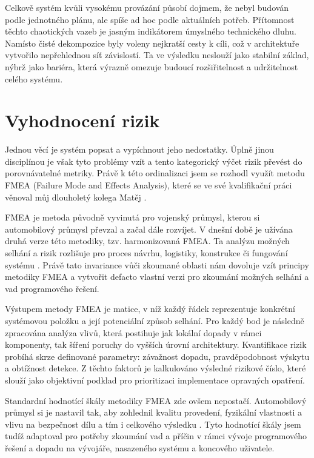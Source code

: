 \documentclass[FM,DP,fonts]{tulthesis}
\begin{document}
Celkově systém kvůli vysokému provázání působí dojmem, že nebyl budován podle jednotného plánu, ale spíše ad hoc podle aktuálních potřeb. Přítomnost těchto chaotických vazeb je jasným indikátorem úmyslného technického dluhu. Namísto čisté dekompozice byly voleny nejkratší cesty k cíli, což v architektuře vytvořilo nepřehlednou síť závislostí. Ta ve výsledku neslouží jako stabilní základ, nýbrž jako bariéra, která výrazně omezuje budoucí rozšiřitelnost a udržitelnost celého systému.

\section{Vyhodnocení rizik}
Jednou věcí je systém popsat a vypíchnout jeho nedostatky. Úplně jinou disciplínou je však tyto problémy vzít a tento kategorický výčet rizik převést do porovnávatelné metriky. Právě k této ordinalizaci jsem se rozhodl využít metodu FMEA (Failure Mode and Effects Analysis), které se ve své kvalifikační práci věnoval můj dlouholetý kolega Matěj \textcite{vokal-thesis}.

FMEA je metoda původně vyvinutá pro vojenský průmysl, kterou si automobilový průmysl převzal a začal dále rozvíjet. V dnešní době je užívána druhá verze této metodiky, tzv. harmonizovaná FMEA. Ta analýzu možných selhání a rizik rozlišuje pro proces návrhu, logistiky, konstrukce či fungování systému \parencite{vokal-thesis}. Právě tato invariance vůči zkoumané oblasti nám dovoluje vzít principy metodiky FMEA a vytvořit defacto vlastní verzi pro zkoumání možných selhání a vad programového řešení.

Výstupem metody FMEA je matice, v níž každý řádek reprezentuje konkrétní systémovou položku a její potenciální způsob selhání. Pro každý bod je následně zpracována analýza vlivů, která postihuje jak lokální dopady v rámci komponenty, tak šíření poruchy do vyšších úrovní architektury. Kvantifikace rizik probíhá skrze definované parametry: závažnost dopadu, pravděpodobnost výskytu a obtížnost detekce. Z těchto faktorů je kalkulováno výsledné rizikové číslo, které slouží jako objektivní podklad pro prioritizaci implementace opravných opatření.

Standardní hodnotící škály metodiky FMEA zde ovšem nepostačí. Automobilový průmysl si je nastavil tak, aby zohlednil kvalitu provedení, fyzikální vlastnosti a vlivu na bezpečnost dílu a tím i celkového výsledku \parencite{vokal-thesis}. Tyto hodnotící škály jsem tudíž adaptoval pro potřeby zkoumání vad a příčin v rámci vývoje programového řešení a dopadu na vývojáře, nasazeného systému a koncového uživatele.
\end{document}
